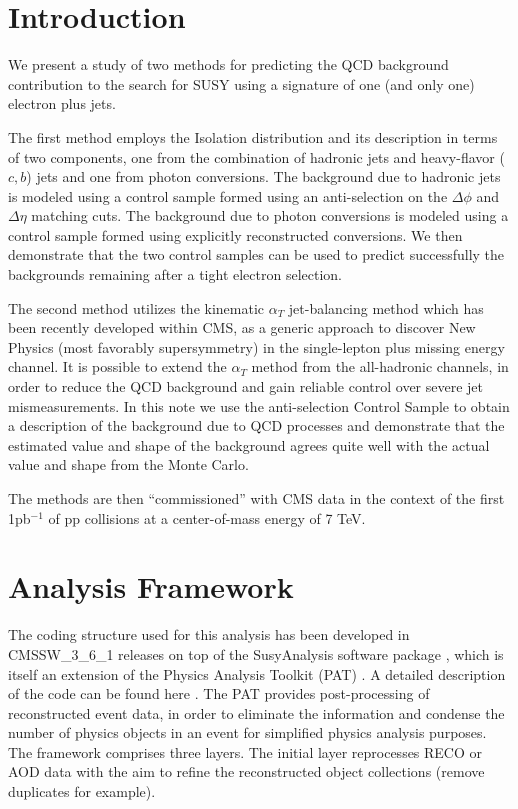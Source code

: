 \section{Introduction}
\label{sec:intro}

We present a study of two methods for predicting the QCD background contribution to the search for SUSY using a signature of one (and only one) electron plus jets.

The first method employs the Isolation distribution and its description in terms of two components, one from the combination of hadronic jets and heavy-flavor ($c,b$) jets and one from photon conversions. The background due to hadronic jets is modeled using a control sample formed using an anti-selection on the $\Delta \phi$ and $\Delta \eta$ matching cuts.  The background due to photon conversions is modeled using a control sample formed using explicitly reconstructed conversions.  We then demonstrate that the two control samples can be used to predict successfully the backgrounds remaining after a tight electron selection.  

The second method utilizes the kinematic $\alpha_{T}$ jet-balancing method which has been recently developed within CMS, as a generic approach to discover New Physics (most favorably supersymmetry) in the single-lepton plus missing energy channel. It is possible to extend the $\alpha_{T}$ method from the all-hadronic channels, in order to reduce the QCD background and gain reliable control over severe jet mismeasurements.  In this note we use the anti-selection Control Sample to obtain a description of the background due to QCD processes and demonstrate that the estimated value and shape of the background agrees quite well with the actual value and shape from the Monte Carlo.

The methods are then ``commissioned'' with CMS data in the context of the first 1pb$^{-1}$ of pp collisions at a center-of-mass energy of 7 TeV.

\section{Analysis Framework}
\label{sec:framework}

The coding structure used for this analysis has been developed in CMSSW\_3\_6\_1 releases on top of the SusyAnalysis software package \cite{susypat1}, which is itself an extension of the Physics Analysis Toolkit (PAT) \cite{susypat2}. A detailed description of the code can be found here \cite{susypat}. The PAT provides post-processing of reconstructed event data, in order to eliminate the information and condense the number of physics objects in an event for simplified physics analysis purposes. The framework comprises three layers. The initial layer reprocesses RECO or AOD data with the aim to refine the reconstructed object collections (remove duplicates for example).

